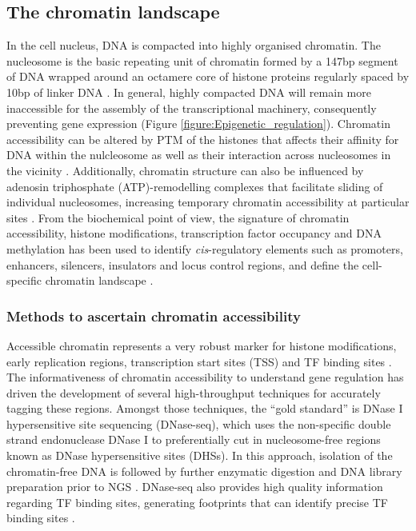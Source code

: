 \subsection{The chromatin landscape}
In the cell nucleus, DNA is compacted into highly organised chromatin. The nucleosome is the basic repeating unit of chromatin formed by a 147bp segment of DNA wrapped around an octamere core of histone proteins regularly spaced by 10bp of linker DNA \parencite{Luger1997}. In general, highly compacted DNA will remain more inaccessible for the assembly of the transcriptional machinery, consequently preventing gene expression (Figure \ref{figure:Epigenetic_regulation}). Chromatin accessibility can be altered by PTM of the histones that affects their affinity for DNA within the nulcleosome as well as their interaction across nucleosomes in the vicinity \parencite{Polach2000,Pepenella2014}. Additionally, chromatin structure can also be influenced by adenosin triphosphate (ATP)-remodelling complexes that facilitate sliding of individual nucleosomes, increasing temporary chromatin accessibility at particular sites \parencite{Cosma1999}. From the biochemical point of view, the signature of chromatin accessibility, histone modifications, transcription factor occupancy and DNA methylation has been used to identify \textit{cis}-regulatory elements such as promoters, enhancers, silencers, insulators and locus control regions, and define the cell-specific chromatin landscape \parencite{Boyle2012,Kundaje2015}.





\subsubsection{Methods to ascertain chromatin accessibility}

Accessible chromatin represents a very robust marker for histone modifications, early replication regions, transcription start sites (TSS) and TF binding sites \parencite{ENCODE2007}. The informativeness of chromatin accessibility to understand gene regulation has driven the development of several high-throughput techniques for accurately tagging these regions. Amongst those techniques, the ``gold standard'' is DNase I hypersensitive site sequencing (DNase-seq), which uses the non-specific double strand endonuclease DNase I to preferentially cut in nucleosome-free regions known as DNase hypersensitive sites (DHSs). In this approach, isolation of the chromatin-free DNA is followed by further enzymatic digestion and DNA library preparation prior to NGS \parencite{John2013}. DNase-seq also provides high quality information regarding TF binding sites, generating footprints that can identify precise TF binding sites  \parencite{Hesselberth2009,Boyle2010}. 

